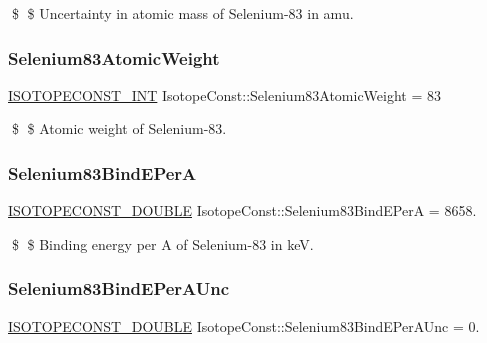 \$ \$ Uncertainty in atomic mass of Selenium-\/83 in amu. \mbox{\label{group___isotope_const-_selenium-_se83_ga29042e0956302b087784bd9ae0b34c01}} 
\subsubsection{\texorpdfstring{Selenium83\+Atomic\+Weight}{Selenium83AtomicWeight}}
{\footnotesize\ttfamily \mbox{\hyperlink{group___isotope_const-_macros_ga5f18360b3e99483a35c32d789e62621c}{I\+S\+O\+T\+O\+P\+E\+C\+O\+N\+S\+T\+\_\+\+I\+NT}} Isotope\+Const\+::\+Selenium83\+Atomic\+Weight = 83}

\$ \$ Atomic weight of Selenium-\/83. \mbox{\label{group___isotope_const-_selenium-_se83_ga116a6584ec9849f6f8fcdd33c87175b2}} 
\subsubsection{\texorpdfstring{Selenium83\+Bind\+E\+PerA}{Selenium83BindEPerA}}
{\footnotesize\ttfamily \mbox{\hyperlink{group___isotope_const-_macros_ga8f45a7272ce02c0b4c65c44636ed719a}{I\+S\+O\+T\+O\+P\+E\+C\+O\+N\+S\+T\+\_\+\+D\+O\+U\+B\+LE}} Isotope\+Const\+::\+Selenium83\+Bind\+E\+PerA = 8658.}

\$ \$ Binding energy per A of Selenium-\/83 in keV. \mbox{\label{group___isotope_const-_selenium-_se83_gaf948394116c9279178c5b46d546c8d18}} 
\subsubsection{\texorpdfstring{Selenium83\+Bind\+E\+Per\+A\+Unc}{Selenium83BindEPerAUnc}}
{\footnotesize\ttfamily \mbox{\hyperlink{group___isotope_const-_macros_ga8f45a7272ce02c0b4c65c44636ed719a}{I\+S\+O\+T\+O\+P\+E\+C\+O\+N\+S\+T\+\_\+\+D\+O\+U\+B\+LE}} Isotope\+Const\+::\+Selenium83\+Bind\+E\+Per\+A\+Unc = 0.}

